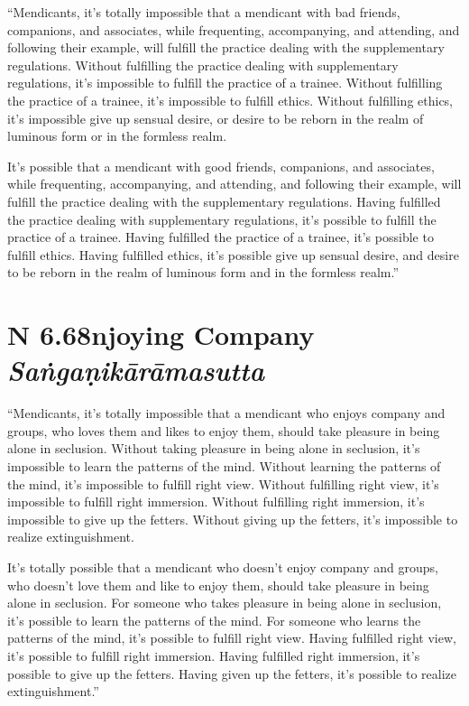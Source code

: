 \documentclass[12pt,openany]{book}%
\newcommand*{\suttatitleacronym}[1]{\smaller[2]{#1}\vspace*{.3em}}
\newcommand*{\suttatitletranslation}[1]{\linebreak{#1}}
\newcommand*{\suttatitleroot}[1]{\linebreak\smaller[2]\itshape{#1}}
\newcommand*{\tocacronym}[1]{\hspace*{-3.3em}{#1}\quad}
\newcommand*{\toctranslation}[1]{#1}
\newcommand*{\tocroot}[1]{(\textit{#1})}
\begin{document}
“Mendicants, it’s totally impossible that a mendicant with bad friends, companions, and associates, while frequenting, accompanying, and attending, and following their example, will fulfill the practice dealing with the supplementary regulations. Without fulfilling the practice dealing with supplementary regulations, it’s impossible to fulfill the practice of a trainee. Without fulfilling the practice of a trainee, it’s impossible to fulfill ethics. Without fulfilling ethics, it’s impossible give up sensual desire, or desire to be reborn in the realm of luminous form or in the formless realm. 

It’s possible that a mendicant with good friends, companions, and associates, while frequenting, accompanying, and attending, and following their example, will fulfill the practice dealing with the supplementary regulations. Having fulfilled the practice dealing with supplementary regulations, it’s possible to fulfill the practice of a trainee. Having fulfilled the practice of a trainee, it’s possible to fulfill ethics. Having fulfilled ethics, it’s possible give up sensual desire, and desire to be reborn in the realm of luminous form and in the formless realm.” 

%
\section*{{\suttatitleacronym AN 6.68}{\suttatitletranslation Enjoying Company }{\suttatitleroot Saṅgaṇikārāmasutta}}
\addcontentsline{toc}{section}{\tocacronym{AN 6.68} \toctranslation{Enjoying Company } \tocroot{Saṅgaṇikārāmasutta}}

“Mendicants, it’s totally impossible that a mendicant who enjoys company and groups, who loves them and likes to enjoy them, should take pleasure in being alone in seclusion. Without taking pleasure in being alone in seclusion, it’s impossible to learn the patterns of the mind. Without learning the patterns of the mind, it’s impossible to fulfill right view. Without fulfilling right view, it’s impossible to fulfill right immersion. Without fulfilling right immersion, it’s impossible to give up the fetters. Without giving up the fetters, it’s impossible to realize extinguishment. 

It’s totally possible that a mendicant who doesn’t enjoy company and groups, who doesn’t love them and like to enjoy them, should take pleasure in being alone in seclusion. For someone who takes pleasure in being alone in seclusion, it’s possible to learn the patterns of the mind. For someone who learns the patterns of the mind, it’s possible to fulfill right view. Having fulfilled right view, it’s possible to fulfill right immersion. Having fulfilled right immersion, it’s possible to give up the fetters. Having given up the fetters, it’s possible to realize extinguishment.” 
\end{document}
